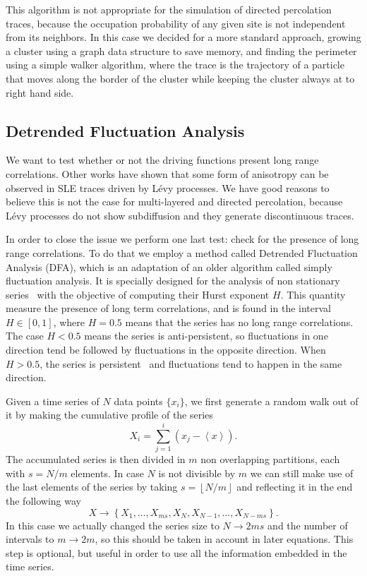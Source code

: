 This algorithm is not appropriate for the simulation of directed percolation
traces, because the occupation probability of any given site is not independent
from its neighbors. In this case we decided for a more standard approach,
growing a cluster using a graph data structure to save memory, and finding the
perimeter using a simple walker algorithm, where the trace is the trajectory of
a particle that moves along the border of the cluster while keeping the cluster
always at to right hand side.

\subsection{Detrended Fluctuation Analysis}
\label{sec:dfa}

We want to test whether or not the driving functions present long range
correlations. Other works have shown that some form of anisotropy can be
observed in SLE traces driven by L\'evy processes. We have good reasons to
believe this is not the case for multi-layered and directed percolation,
because L\'evy processes do not show subdiffusion and they generate
discontinuous traces.

In order to close the issue we perform one last test: check for the presence of
long range correlations. To do that we employ a method called Detrended
Fluctuation Analysis (DFA), which is an adaptation of an older
algorithm called simply fluctuation analysis. It is specially designed for the
analysis of non stationary series~\cite{Peng1993, Hardstone2012} with the
objective of computing their Hurst exponent $H$. This quantity measure the
presence of long term correlations, and is found in the interval $H\in[0,1]$,
where $H=0.5$ means that the series has no long range correlations. The case
$H<0.5$ means the series is anti-persistent, so fluctuations in one direction
tend be followed by fluctuations in the opposite direction. When $H>0.5$, the
series is persistent~\cite{Matos2008} and fluctuations tend to happen in the
same direction.

Given a time series of $N$ data points $\{x_i\}$, we first generate a random walk
out of it by making the cumulative profile of the series
\begin{equation}
    X_i = \sum_{j=1}^{i} \left({x_j - \left\langle x \right\rangle}\right).
\end{equation}
The accumulated series is then divided in $m$ non overlapping partitions, each with
$s = N/m$ elements. In case $N$ is not divisible by $m$ we can still make use
of the last elements of the series by taking $s=\left\lfloor N/m\right\rfloor$
and reflecting it in the end the following way
\begin{equation}
    X\rightarrow\left\{X_1, \ldots, X_{ms},
                       X_{N}, X_{N - 1}, \ldots,
                       X_{N - ms}\right\}.
\end{equation}
In this case we actually changed the series size to $N\rightarrow2ms$ and the
number of intervals to $m\rightarrow2m$, so this should be taken in account in
later equations. This step is optional, but useful in order to use all the
information embedded in the time series.

